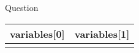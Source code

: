 \begin{minipage}{\linewidth}
{{ Question }}\\

    \begin{tabular}{ | c | c |}
    \hline
    {{ variables[0] }} & {{ variables[1] }} \\ \hline
    {%
        {%
    {%
    \hline
    \end{tabular}
\end{minipage}
